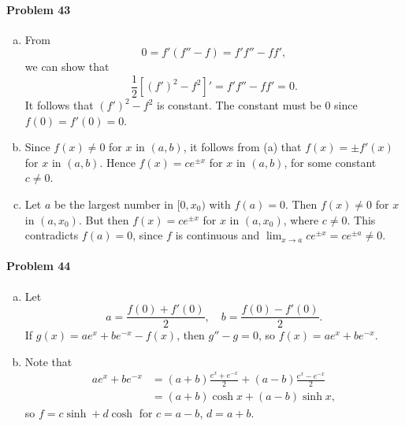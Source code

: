 \documentclass{article}
\begin{document}
\paragraph{Problem 43}
\begin{enumerate}[(a)]
  \item From \[
      0 = f'(f'' - f) = f'f'' - ff',
    \] we can show that \[
      \frac{1}{2}[(f')^2 - f^2]' = f'f'' - ff' = 0.
    \] It follows that $(f')^2 - f^2$ is constant. The constant must be 0 since
    $f(0) = f'(0) = 0$.
  \item Since $f(x) \neq 0$ for $x$ in $(a, b)$, it follows from (a) that
    $f(x) = \pm f'(x)$ for $x$ in $(a, b)$. Hence $f(x) = ce^{\pm x}$ for $x$
    in $(a, b)$, for some constant $c \neq 0$.
  \item Let $a$ be the largest number in $[0, x_0)$ with $f(a) = 0$. Then $f(x)
    \neq 0$ for $x$ in $(a, x_0)$. But then $f(x) = ce^{\pm x}$ for $x$ in
    $(a, x_0)$, where $c \neq 0$. This contradicts $f(a) = 0$, since $f$ is
    continuous and $\lim_{x \to a} ce^{\pm x} = ce^{\pm a} \neq 0$.
\end{enumerate}

\paragraph{Problem 44}
\begin{enumerate}[(a)]
  \item Let \[
      a = \frac{f(0) + f'(0)}{2},\quad b = \frac{f(0) - f'(0)}{2}.
    \] If $g(x) = ae^x + be^{-x} - f(x)$, then $g'' - g = 0$, so $f(x) = ae^x +
    be^{-x}$.
  \item Note that
    \begin{align*}
      ae^x + be^{-x}
      &= (a + b)\frac{e^x + e^{-x}}{2} + (a - b)\frac{e^x - e^{-x}}{2} \\
      &= (a + b)\cosh x + (a - b)\sinh x,
    \end{align*}
    so $f = c\sinh + d\cosh$ for $c = a - b$, $d = a + b$.
\end{enumerate}
\end{document}
